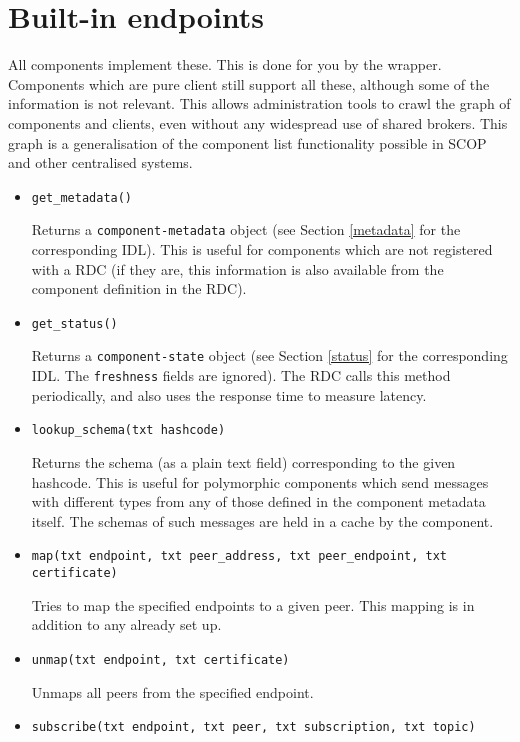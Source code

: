 \documentclass[12pt,a4paper,twoside]{article}
\renewcommand{\_}{\texttt{\symbol{95}}}
\begin{document}
\newpage
\section{Built-in endpoints}
\label{builtin}

All components implement these. This is done for you by the wrapper.
Components which are pure client still support all these,
although some of the information is not relevant.
This allows administration tools to crawl the graph of components and
clients, even without any widespread use of shared brokers. This graph
is a generalisation of the component list functionality possible in
SCOP and other centralised systems.

\begin{itemize}

\item \verb^get_metadata()^

Returns a \verb^component-metadata^ object (see Section \ref{metadata}
for the corresponding IDL). This is useful for components
which are not registered with a RDC (if they are, this information
is also available from the component definition in the RDC).

\item \verb^get_status()^

Returns a \verb^component-state^ object (see Section \ref{status}
for the corresponding IDL. The \verb^freshness^
fields are ignored). The RDC calls this
method periodically, and also uses the response time to
measure latency.

\item \verb^lookup_schema(txt hashcode)^

Returns the schema (as a plain text field)
corresponding to the given hashcode. This is useful for polymorphic
components which send messages with different types from any of
those defined in the component metadata itself. The schemas of
such messages are held in a cache by the component.

\item \verb^map(txt endpoint, txt peer_address, txt peer_endpoint, txt certificate)^

Tries to map the specified endpoints to a given peer. This mapping
is in addition to any already set up.

\item \verb^unmap(txt endpoint, txt certificate)^

Unmaps all peers from the specified endpoint.

\item \verb^subscribe(txt endpoint, txt peer, txt subscription, txt topic)^


\end{itemize}
\end{document}
